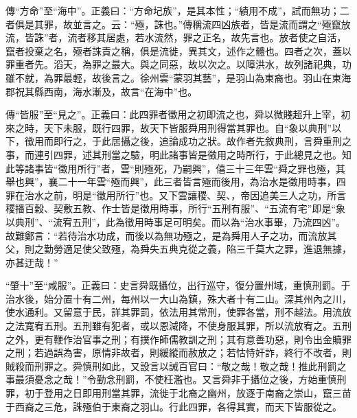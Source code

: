 {\noindent\zhuan{}\fzbyks 傳“方命”至“海中”。正義曰：“方命圮族”，是其本性；“績用不成”，試而無功；二者俱是其罪，故並言之。云：“殛，誅也。”傳稱流四凶族者，皆是流而謂之“殛竄放流，皆誅”者，流者移其居處，若水流然，罪之正名，故先言也。放者使之自活，竄者投棄之名，殛者誅責之稱，俱是流徙，異其文，述作之體也。四者之次，蓋以罪重者先。滔天，為罪之最大。與之同惡，故以次之。以障洪水，故列諸祀典，功雖不就，為罪最輕，故後言之。徐州雲“蒙羽其藝”，是羽山為東裔也。羽山在東海郡祝其縣西南，海水漸及，故言“在海中”也。 \par}

{\noindent\zhuan{}\fzbyks 傳“皆服”至“見之”。正義曰：此四罪者徵用之初即流之也，舜以微賤超升上宰，初來之時，天下未服，既行四罪，故天下皆服舜用刑得當其罪也。自“象以典刑”以下，徵用而即行之，于此居攝之後，追論成功之狀。故作者先敘典刑，言舜重刑之事，而連引四罪，述其刑當之驗，明此諸事皆是徵用之時所行，于此總見之也。知此等諸事皆“徵用所行”者，雲“則殛死，乃嗣興”，僖三十三年雲“舜之罪也殛，其舉也興”，襄二十一年雲“殛而興”，此三者皆言殛而後用，為治水是徵用時事，四罪在治水之前，明是“徵用所行”也。又下雲讓稷、契、，帝因追美三人之功，所言稷播百穀、契敷五教、作士皆是徵用時事，所行“五刑有服”、“五流有宅”即是“象以典刑”、“流宥五刑”，此為徵用時事足可明矣。而以為“治水事畢，乃流四凶”。故難鄭言：“若待治水功成，而後以為無功殛之，是為舜用人子之功，而流放其父，則之勤勞適足使父致殛，為舜失五典克從之義，陷三千莫大之罪，進退無據，亦甚迂哉！” \par}

{\noindent\shu{}\fzkt “肇十”至“咸服”。正義曰：史言舜既攝位，出行巡守，復分置州域，重慎刑罰。于治水後，始分置十有二州，每州以一大山為鎮，殊大者十有二山。深其州內之川，使水通利。又留意于民，詳其罪罰，依法用其常刑，使罪各當，刑不越法。用流放之法寬宥五刑。五刑雖有犯者，或以恩減降，不使身服其罪，所以流放宥之。五刑之外，更有鞭作治官事之刑；有撲作師儒教訓之刑；其有意善功惡，則令出金贖罪之刑；若過誤為害，原情非故者，則緩縱而赦放之；若怙恃奸詐，終行不改者，則賊殺而刑罪之。舜慎刑如此，又設言以誡百官曰：“敬之哉！敬之哉！推此刑罰之事最須憂念之哉！”令勤念刑罰，不使枉濫也。又言舜非于攝位之後，方始重慎刑罪，初于登用之日即用刑當其罪，流徙于北裔之幽州，放逐于南裔之崇山，竄三苗于西裔之三危，誅殛伯于東裔之羽山。行此四罪，各得其實，而天下皆服從之。 \par}

